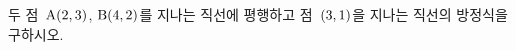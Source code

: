두 점~$\mathrm{A}(2{,}\mkern3mu\mathopen{}3)$, $\mathrm{B}(4{,}\mkern3mu\mathopen{}2)$를 지나는 직선에 평행하고 점~$(3{,}\mkern3mu\mathopen{}1)$을 지나는 직선의 방정식을 구하시오.
